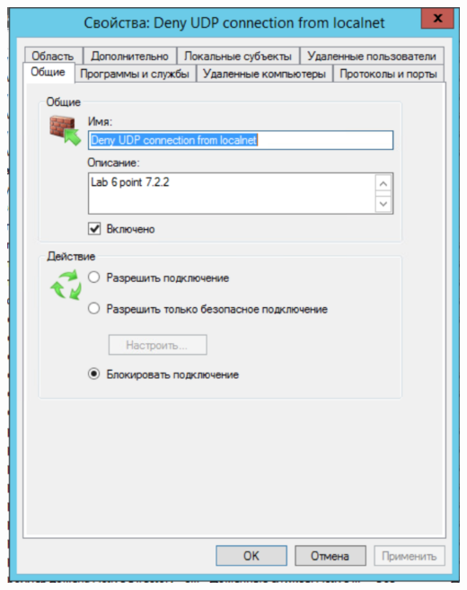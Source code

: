 \documentclass[a4paper,14pt]{extarticle}
\begin{document}
    \begin{center}
        \includegraphics[scale=0.7]{7.4.1.png}
    \end{center}
\end{document}
